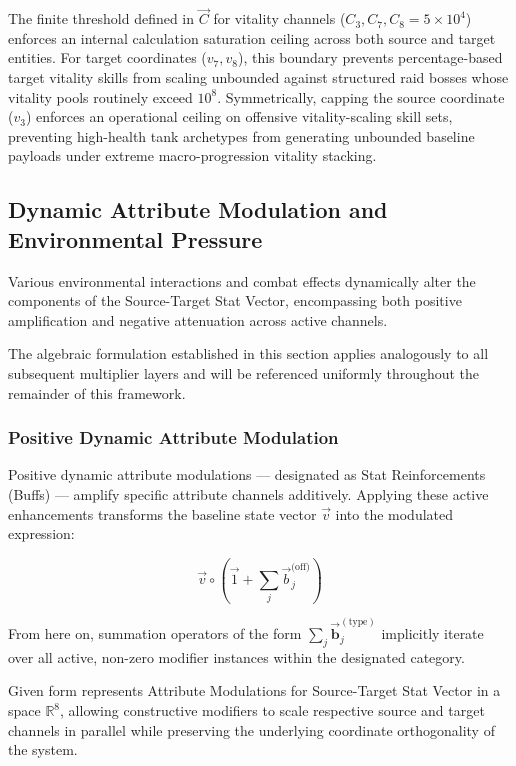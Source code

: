 \documentclass[twocolumn,10pt]{article}
\begin{document}
The finite threshold defined in $\vec{C}$ for vitality channels ($C_3, C_7, C_8 = 5 \times 10^4$) enforces an internal calculation saturation ceiling across both source and target entities. For target coordinates ($v_7, v_8$), this boundary prevents percentage-based target vitality skills from scaling unbounded against structured raid bosses whose vitality pools routinely exceed $10^8$. Symmetrically, capping the source coordinate ($v_3$) enforces an operational ceiling on offensive vitality-scaling skill sets, preventing high-health tank archetypes from generating unbounded baseline payloads under extreme macro-progression vitality stacking.
\subsection{Dynamic Attribute Modulation and Environmental Pressure}

Various environmental interactions and combat effects dynamically alter the components of the Source-Target Stat Vector, encompassing both positive amplification and negative attenuation across active channels.

The algebraic formulation established in this section applies analogously to all subsequent multiplier layers and will be referenced uniformly throughout the remainder of this framework.

\subsubsection{Positive Dynamic Attribute Modulation}

Positive dynamic attribute modulations — designated as Stat Reinforcements (Buffs) — amplify specific attribute channels additively. Applying these active enhancements transforms the baseline state vector $\vec{v}$ into the modulated expression:

\begin{equation}
\label{eq:pos_dyn_attr_mod}
  \vec{v} \circ \left(\vec{1} + \sum_{j}{\vec{b}_{j}^{\text{(off)}}}\right)
\end{equation}

From here on, summation operators of the form $\sum_j \vec{\mathbf{b}}_j^{(\text{type})}$ implicitly iterate over all active, non-zero modifier instances within the designated category.

Given form represents Attribute Modulations for Source-Target Stat Vector in a space $\mathbb{R}^8$, allowing constructive modifiers to scale respective source and target channels in parallel while preserving the underlying coordinate orthogonality of the system.
\end{document}

